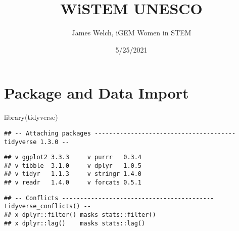 \documentclass[
]{article}
\title{WiSTEM UNESCO}
\author{James Welch, iGEM Women in STEM}
\date{5/25/2021}
\newenvironment{Shaded}{\begin{snugshade}}{\end{snugshade}}
\newcommand{\FunctionTok}[1]{\textcolor[rgb]{0.00,0.00,0.00}{#1}}
\newcommand{\NormalTok}[1]{#1}
\begin{document}
\maketitle

\hypertarget{package-and-data-import}{%
\section{Package and Data Import}\label{package-and-data-import}}

\begin{Shaded}
\begin{Highlighting}[]
\FunctionTok{library}\NormalTok{(tidyverse)}
\end{Highlighting}
\end{Shaded}

\begin{verbatim}
## -- Attaching packages --------------------------------------- tidyverse 1.3.0 --
\end{verbatim}

\begin{verbatim}
## v ggplot2 3.3.3     v purrr   0.3.4
## v tibble  3.1.0     v dplyr   1.0.5
## v tidyr   1.1.3     v stringr 1.4.0
## v readr   1.4.0     v forcats 0.5.1
\end{verbatim}

\begin{verbatim}
## -- Conflicts ------------------------------------------ tidyverse_conflicts() --
## x dplyr::filter() masks stats::filter()
## x dplyr::lag()    masks stats::lag()
\end{verbatim}
\end{document}
